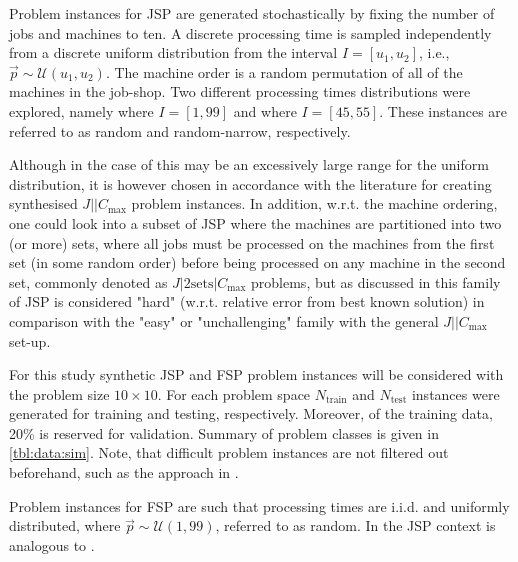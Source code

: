 \documentclass[smallextended]{svjour3}
\begin{document}
Problem instances for JSP are generated stochastically by fixing the number of 
jobs and machines to ten. A discrete processing time is sampled independently from a 
discrete uniform distribution from the interval $I=[u_1,u_2]$, i.e., 
$\vec{p}\sim \mathcal{U}(u_1,u_2)$. 
The machine order is a random permutation of all of the machines in the 
job-shop. Two different processing times distributions were explored, namely   
where $I=[1,99]$ and  where $I=[45,55]$. These instances 
are referred to as random and random-narrow, respectively. 

Although in the case of   this may be an excessively large range for 
the uniform distribution, it is however chosen in accordance with the 
literature \citep{Demirkol98} for creating synthesised $J||C_{\max}$ problem 
instances. In addition, w.r.t. the machine ordering, one could look into a 
subset of JSP where the machines are partitioned into two (or more) sets, where 
all jobs must be processed on the machines from the first set (in some random 
order) before being processed on any machine in the second set, commonly 
denoted as $J|2\textrm{sets}|C_{\max}$ problems, but as discussed in 
\cite{orlib_swv} this family of JSP is considered "hard" (w.r.t. relative error 
from best known solution) in comparison with the "easy" or "unchallenging" 
family with the general $J||C_{\max}$ set-up. %


For this study synthetic JSP and FSP problem instances will be considered with 
the problem size $10\times10$. 
For each problem space $N_{\text{train}}$  and $N_{\text{test}}$ instances were 
generated for training and testing, respectively. Moreover, of the training 
data, 20\% is reserved for validation.
Summary of problem classes is given in \cref{tbl:data:sim}.  
Note, that difficult problem instances are not filtered out beforehand, such as 
the approach in \citet{Whitley}. 



Problem instances for FSP are such that processing times are i.i.d. and 
uniformly distributed,   where $\vec{p}\sim\mathcal{U}(1,99)$, 
referred to as random. In the JSP context   is analogous to 
. 
\end{document}
